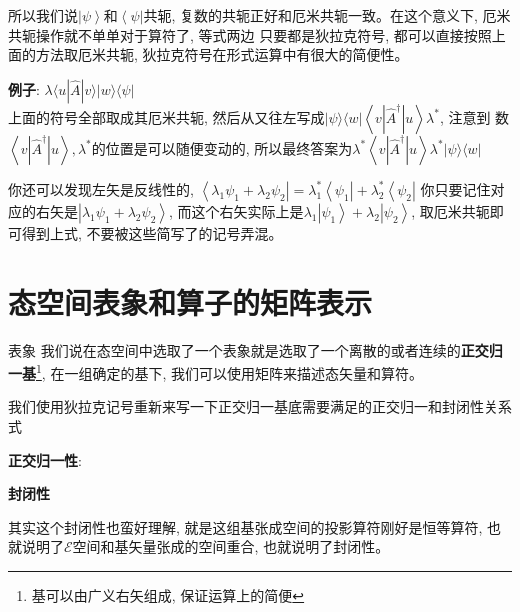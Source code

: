 所以我们说$\left|\psi\right\rangle$和$\left\langle \psi \right|$共轭, 复数的共轭正好和厄米共轭一致。在这个意义下, 厄米共轭操作就不单单对于算符了, 等式两边
只要都是狄拉克符号, 都可以直接按照上面的方法取厄米共轭, 狄拉克符号在形式运算中有很大的简便性。
\begin{thinknote}
    \textbf{例子}:  $\lambda\langle u|\hat{A}| v\rangle|w\rangle\langle\psi|$\\
    上面的符号全部取成其厄米共轭, 然后从又往左写成$|\psi\rangle\langle w|\left\langle v\left|\hat{A}^{\dagger}\right| u\right\rangle \lambda^{*}$, 注意到
    数$\left\langle v\left|\hat{A}^{\dagger}\right| u\right\rangle,\lambda^{*}$的位置是可以随便变动的, 所以最终答案为$\lambda^{*}\left\langle v\left|\hat{A}^{\dagger}\right| u\right\rangle\lambda^{*}|\psi\rangle\langle w|$
\end{thinknote}
你还可以发现左矢是反线性的, $\left\langle\lambda_1\psi_1+\lambda_2\psi_2\right| =\lambda_1^*\left\langle\psi_1\right|+\lambda_2^*\left\langle\psi_2\right|$
你只要记住对应的右矢是$\left|\lambda_1\psi_1+\lambda_2\psi_2\right\rangle$, 而这个右矢实际上是$\lambda_1\left|\psi_1\right\rangle+\lambda_2\left|\psi_2\right\rangle $, 取厄米共轭即可得到上式, 不要被这些简写了的记号弄混。

\section{态空间表象和算子的矩阵表示}
\begin{define}{表象}
    我们说在态空间中选取了一个表象就是选取了一个离散的或者连续的\textbf{正交归一基}\footnote[1]{基可以由广义右矢组成, 保证运算上的简便}, 在一组确定的基下, 我们可以使用矩阵来描述态矢量和算符。
\end{define}
我们使用狄拉克记号重新来写一下正交归一基底需要满足的正交归一和封闭性关系式

\textbf{正交归一性}:
\begin{lequation}
    \label{eq:B.12}
\end{lequation}

\textbf{封闭性}
\begin{lequation}
    \label{eq:B.13}
\end{lequation}
其实这个封闭性也蛮好理解, 就是这组基张成空间的投影算符刚好是恒等算符, 也就说明了$\mathscr{E}$空间和基矢量张成的空间重合, 也就说明了封闭性。

